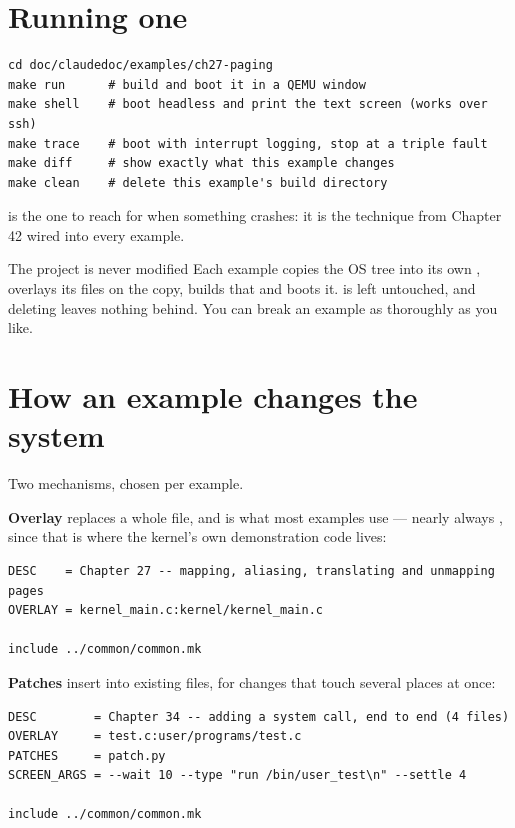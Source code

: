 \section{Running one}

\begin{lstlisting}[style=sh]
cd doc/claudedoc/examples/ch27-paging
make run      # build and boot it in a QEMU window
make shell    # boot headless and print the text screen (works over ssh)
make trace    # boot with interrupt logging, stop at a triple fault
make diff     # show exactly what this example changes
make clean    # delete this example's build directory
\end{lstlisting}

 is the one to reach for when something crashes: it is the technique from
Chapter 42 wired into every example.

\begin{concept}{The project is never modified}
Each example copies the OS tree into its own , overlays its files on the
copy, builds that and boots it.  is left untouched, and deleting
 leaves nothing behind. You can break an example as thoroughly as you like.
\end{concept}

\section{How an example changes the system}

Two mechanisms, chosen per example.

\textbf{Overlay} replaces a whole file, and is what most examples use --- nearly always
, since that is where the kernel's own demonstration code lives:

\begin{lstlisting}[style=mk]
DESC    = Chapter 27 -- mapping, aliasing, translating and unmapping pages
OVERLAY = kernel_main.c:kernel/kernel_main.c

include ../common/common.mk
\end{lstlisting}

\textbf{Patches} insert into existing files, for changes that touch several places at once:

\begin{lstlisting}[style=mk]
DESC        = Chapter 34 -- adding a system call, end to end (4 files)
OVERLAY     = test.c:user/programs/test.c
PATCHES     = patch.py
SCREEN_ARGS = --wait 10 --type "run /bin/user_test\n" --settle 4

include ../common/common.mk
\end{lstlisting}

